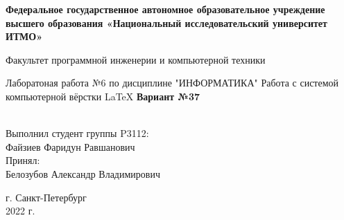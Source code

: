 \documentclass{article}
\begin{document}
\begin{center}
\begin{huge}

\textbf{Федеральное государственное автономное образовательное учреждение\linebreak
высшего образования «Национальный исследовательский университет\linebreak
ИТМО»}\linebreak


Факультет программной инженерии и компьютерной техники

\vspace*{\fill}
Лаборатоная работа №6\linebreak
по дисциплине "ИНФОРМАТИКА"\linebreak
Работа с системой компьютерной вёрстки \LaTeX\linebreak
\textbf{Вариант №37}\linebreak
\vspace*{\fill}

\begin{raggedleft}
\\
Выполнил студент группы P3112:\\
Файзиев Фаридун Равшанович\\
Принял:\\
Белозубов Александр Владимирович\\

\end{raggedleft}

\vspace*{\fill}
г. Санкт-Петербург\\
2022 г.

\end{huge}
\end{center}
\end{document}
